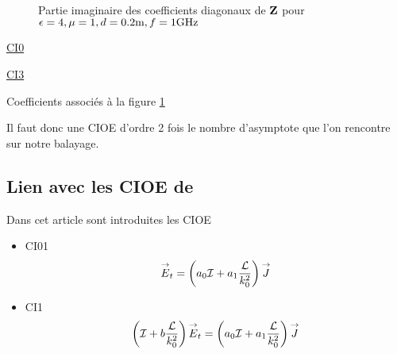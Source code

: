       \begin{figure}[!hbt]
          \centering
          
          \caption[CIOE sur empilement avec triple asymptote]{Partie imaginaire des coefficients diagonaux de \(\mathbf{Z}\) pour \(\epsilon = 4, \mu = 1, d=0.2\text{m}, f=1\text{GHz}\)}
          \label{fig:imp_fourier:plan:triple_asymptote:hoibc}
      \end{figure}
      \begin{table}[!hbt]
        \centering
        \begin{minipage}[t]{0.49\textwidth}
        \vspace{0pt}
        \centering
        \begin{coefftable}{\hyperlink{ci0}{CI0}}
          
        \end{coefftable}

        \begin{coefftable}{\hyperlink{ci3}{CI3}}
          
        \end{coefftable}
        \end{minipage}
        \caption{Coefficients associés à la figure \ref{fig:imp_fourier:plan:triple_asymptote:hoibc}}
        \label{tab:imp_fourier:plan:triple_asymptote:hoibc}
      \end{table}
      Il faut donc une CIOE d'ordre 2 fois le nombre d'asymptote que l'on rencontre sur notre balayage.

  \subsection{Lien avec les CIOE de \cite{stupfel_implementation_2015}}

    Dans cet article sont introduites les CIOE
    \begin{itemize}
      \item CI01
        \begin{equation}
          {\overset{\rightarrow}{E}}_t = \left(a_0{\mathcal{I}} + a_1\dfrac{\mathcal{L}}{k_0^2}\right){\overset{\rightarrow}{J}}
        \end{equation}
      \item CI1
        \begin{equation}
          \left({\mathcal{I}} + b\dfrac{\mathcal{L}}{k_0^2} \right){\overset{\rightarrow}{E}}_t = \left(a_0{\mathcal{I}} + a_1\dfrac{\mathcal{L}}{k_0^2}\right){\overset{\rightarrow}{J}}
        \end{equation}
    \end{itemize}

